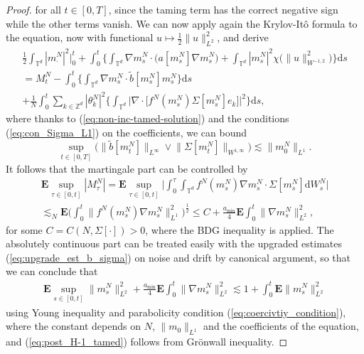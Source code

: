 \begin{proof}
for all $t \in [0,T]$, since the taming term has the correct negative sign while the other terms vanish. We can now apply again the Krylov-It\^o formula to the equation, now with functional $u \mapsto \frac{1}{2} \|u\|_{L^2}^2$, and derive 
\begin{equation*}
\begin{split}
     \frac{1}{2} \int_{\mathbb{T}^d} |m^N_{\cdot}|^2\Big|_0^t 
     + \int_0^t\Big\{\int_{\mathbb{T}^d}  \nabla m_s^N \cdot \big(a[m_s^N]\nabla m_s^N\big) +\int_{\mathbb{T}^d} |m_s^N|^2 \chi\big( \|u\|_{W^{-1,2}}^2\big) \Big\}\mathrm{d}s\\
     = M^N_t - \int_0^t\Big\{\int_{\mathbb{T}^d} \nabla m_s^N \cdot \tilde{b}[m^N_s]m^N_s \Big\}\mathrm{d}s \\ 
    + \frac{1}{N}\int_0^t\sum_{k \in \mathbb{Z}^d}|\theta_k^N|^2 \Big\{\int_{\mathbb{T}^d}\Big|\nabla \cdot \Big[f^N(m_s^{N} ) \Sigma[m_s^N] e_k\Big]\Big|^2\Big\}\mathrm{d}s,
\end{split}
\end{equation*}
where thanks to (\ref{eq:non-inc-tamed-solution}) and the conditions (\ref{eq:con_Sigma_L1}) on the coefficients, we can bound 
\begin{equation}\label{eq:upgrade_est_b_sigma}
\sup_{t \in [0,T]}\Big(\big\|\tilde{b}[m^N_t]\big\|_{L^{\infty}} \vee \big\|\Sigma[m^N_t]\big\|_{W^{1,\infty}} \Big)\lesssim \|m_0^N\|_{L^1}.
\end{equation}
It follows that the martingale part can be controlled by
\begin{align*}
\mathbf{E}\sup_{\tau \in [0,t]}|M^N_\tau| = \mathbf{E}\sup_{\tau \in [0,t]}\Big|\int_0^{\tau} \int_{\mathbb{T}^d} f^N(m_s^N) \nabla m_s^N \cdot \Sigma[m_s^N]\mathrm{d}W^N_s  \Big|\\
\lesssim_N \mathbf{E} \Big(\int_0^t \big\| f^N(m_s^N) \nabla m_s^N \big\|_{L^1}^2 \Big)^{\frac{1}{2}} \leq C + \frac{a_{\min}}{4}\mathbf{E} \int_0^t \|\nabla m_s^N\|_{L^2}^2,
\end{align*}
for some $C = C(N,\Sigma[\cdot])> 0$, where the BDG inequality is applied. The absolutely continuous part can be treated easily with the upgraded estimates (\ref{eq:upgrade_est_b_sigma}) on noise and drift by canonical argument, so that we can conclude that 
\begin{align*}
\mathbf{E}\sup_{s \in [0,t]} \|m_s^N\|^2_{L^2} + \frac{a_{\min}}{4}\mathbf{E} \int_0^t \|\nabla m_s^N\|_{L^2}^2 \lesssim 1 + \int_0^t \mathbf{E}\|m_s^N\|_{L^2}^2 
\end{align*}
using Young inequality and parabolicity condition (\ref{eq:coercivtiy_condition}), where the constant depends on $N$, $\|m_0\|_{L^1}$ and the coefficients of the equation, and (\ref{eq:post_H-1_tamed}) follows from Grönwall inequality.
\end{proof}

